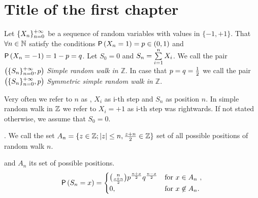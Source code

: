 \chapter{Title of the first chapter}

\begin{defn}\label{defn-simple_random_walk_Z}
 Let $\{X_n\}_{n=0}^{+\infty}$ be a sequence of \iid random variables with values in $\{ -1, +1\}$. That $\forall n \in \mathbb{N}$ satisfy the conditions $\operatorname{\textsf{P}} \left( X_n=1 \right) =p \in \left( 0,1 \right) $ and $\operatorname{\textsf{P}} \left( X_n=-1 \right) =1-p=q$.
 Let $S_0=0$ and $S_n=\suma[i][1][n]X_i$. We call the pair $ \left( \{S_n\}_{n=0}^{+\infty}, p \right) $ \emph{Simple random walk in $\mathbb{Z}$}. In case that $p=q=\frac{1}{2} $ we call the pair $ \left( \{S_n\}_{n=0}^{+\infty}, p \right) $ \emph{Symmetric simple random walk in $\mathbb{Z}$}.
\end{defn}

\begin{rem}
 Very often we refer to $n$ as \Time, $X_i$ as i-th step and $S_n$ as position \intime $n$.
 In simple random walk in $\mathbb{Z}$ we refer to $X_i=+1$ as i-th step was rightwards. If not stated otherwise, we assume that $S_0=0.$
\end{rem}

\begin{defn}\label{defn-set_all_possible_values}
 \Lrw. We call the set $A_n=\{z \in \mathbb{Z}; \left|{z}\right|\leq n, \frac{z+n}{2}\in \mathbb{Z} \}$ set of all possible positions of random walk \rw \intime $n$.
\end{defn}


\begin{thm}\label{thm-probability_position_time}
 \Lrw and $A_n$ its set of possible positions.
 \[
 \operatorname{\textsf{P}} \left( S_n=x \right) =
 \begin{cases}
 \binom{n}{\frac{x+n}{2}}p^{\frac{n+x}{2}}q^{\frac{n-x}{2}} & \text{for $x \in A_n$ },\\
 0, & \text{for $x \not\in A_n$}.
 \end{cases}
 \]
\end{thm}

